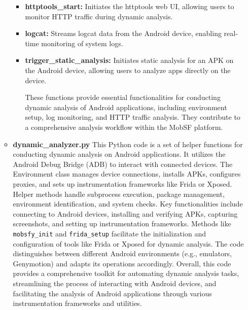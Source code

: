 \documentclass{report}
\begin{document}
\begin{itemize}
\begin{itemize}
\begin{itemize}
            \item \textbf{httptools\_start:} Initiates the httptools web UI, allowing users to monitor HTTP traffic during dynamic analysis.
            
            \item \textbf{logcat:} Streams logcat data from the Android device, enabling real-time monitoring of system logs.
            
            \item \textbf{trigger\_static\_analysis:} Initiates static analysis for an APK on the Android device, allowing users to analyze apps directly on the device.
            
            These functions provide essential functionalities for conducting dynamic analysis of Android applications, including environment setup, log monitoring, and HTTP traffic analysis. They contribute to a comprehensive analysis workflow within the MobSF platform.
        \end{itemize}

        \item \textbf{dynamic\_analyzer.py}   
        This Python code is a set of helper functions for conducting dynamic analysis on Android applications. It utilizes the Android Debug Bridge (ADB) to interact with connected devices. The Environment class manages device connections, installs APKs, configures proxies, and sets up instrumentation frameworks like Frida or Xposed. Helper methods handle subprocess execution, package management, environment identification, and system checks.\newline
        Key functionalities include connecting to Android devices, installing and verifying APKs, capturing screenshots, and setting up instrumentation frameworks. Methods like \texttt{mobsfy\_init} and \texttt{frida\_setup} facilitate the initialization and configuration of tools like Frida or Xposed for dynamic analysis. The code distinguishes between different Android environments (e.g., emulators, Genymotion) and adapts its operations accordingly.
        \newline
        Overall, this code provides a comprehensive toolkit for automating dynamic analysis tasks, streamlining the process of interacting with Android devices, and facilitating the analysis of Android applications through various instrumentation frameworks and utilities.


\end{itemize}
\end{itemize}
\end{document}
